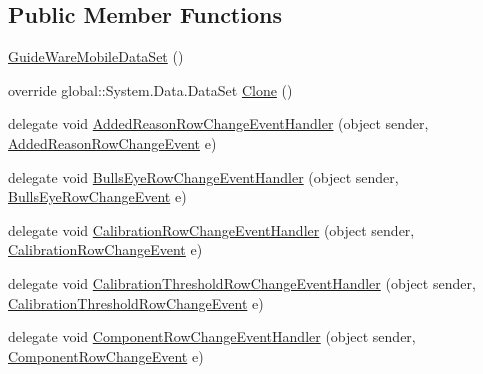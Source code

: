 \subsection*{Public Member Functions}
\begin{DoxyCompactItemize}
\item 
\hyperlink{class_env_int_1_1_win32_1_1_field_tech_1_1_manager_1_1_data_sets_1_1_guide_ware_mobile_data_set_a1220ad2590be3bea2d95f22e5bf3f99a}{Guide\+Ware\+Mobile\+Data\+Set} ()
\item 
override global\+::\+System.\+Data.\+Data\+Set \hyperlink{class_env_int_1_1_win32_1_1_field_tech_1_1_manager_1_1_data_sets_1_1_guide_ware_mobile_data_set_ab8ded11b1322ba9752fb14c75932c7cb}{Clone} ()
\item 
delegate void \hyperlink{class_env_int_1_1_win32_1_1_field_tech_1_1_manager_1_1_data_sets_1_1_guide_ware_mobile_data_set_aead16eee25126bf6e05556fe0f089c0c}{Added\+Reason\+Row\+Change\+Event\+Handler} (object sender, \hyperlink{class_env_int_1_1_win32_1_1_field_tech_1_1_manager_1_1_data_sets_1_1_guide_ware_mobile_data_set_03c6c2b8486bc739eb1146c140ad3745}{Added\+Reason\+Row\+Change\+Event} e)
\item 
delegate void \hyperlink{class_env_int_1_1_win32_1_1_field_tech_1_1_manager_1_1_data_sets_1_1_guide_ware_mobile_data_set_ad49d2ce7b82f70b47ec759d125a6e795}{Bulls\+Eye\+Row\+Change\+Event\+Handler} (object sender, \hyperlink{class_env_int_1_1_win32_1_1_field_tech_1_1_manager_1_1_data_sets_1_1_guide_ware_mobile_data_set_1_1_bulls_eye_row_change_event}{Bulls\+Eye\+Row\+Change\+Event} e)
\item 
delegate void \hyperlink{class_env_int_1_1_win32_1_1_field_tech_1_1_manager_1_1_data_sets_1_1_guide_ware_mobile_data_set_a86b53257f620f53ee62af7c3677d9475}{Calibration\+Row\+Change\+Event\+Handler} (object sender, \hyperlink{class_env_int_1_1_win32_1_1_field_tech_1_1_manager_1_1_data_sets_1_1_guide_ware_mobile_data_set_84870cfb39b084eaa7965416caa9d277}{Calibration\+Row\+Change\+Event} e)
\item 
delegate void \hyperlink{class_env_int_1_1_win32_1_1_field_tech_1_1_manager_1_1_data_sets_1_1_guide_ware_mobile_data_set_a2a61338e8d68c897b004fe6fa4479d4e}{Calibration\+Threshold\+Row\+Change\+Event\+Handler} (object sender, \hyperlink{class_env_int_1_1_win32_1_1_field_tech_1_1_manager_1_1_data_sets_1_1_guide_ware_mobile_data_set_fbaa872ead219fa1546c6a3dbe0bab70}{Calibration\+Threshold\+Row\+Change\+Event} e)
\item 
delegate void \hyperlink{class_env_int_1_1_win32_1_1_field_tech_1_1_manager_1_1_data_sets_1_1_guide_ware_mobile_data_set_ab767e59a10801c8c87ea9efc7cbfbd8b}{Component\+Row\+Change\+Event\+Handler} (object sender, \hyperlink{class_env_int_1_1_win32_1_1_field_tech_1_1_manager_1_1_data_sets_1_1_guide_ware_mobile_data_set_1_1_component_row_change_event}{Component\+Row\+Change\+Event} e)

\end{DoxyCompactItemize}

